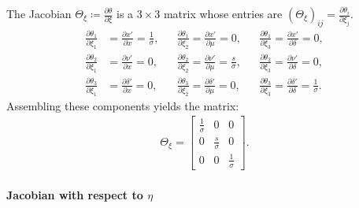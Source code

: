 \documentclass{article}
\begin{document}
The Jacobian $\Theta_\xi \coloneqq \frac{\partial \theta}{\partial \xi}$ is a $3 \times 3$ matrix whose entries are $(\Theta_\xi)_{ij} = \frac{\partial \theta_i}{\partial \xi_j}$.
%
\begin{align}
  \frac{\partial \theta_1}{\partial \xi_1} & = \frac{\partial x'}{\partial x} = \frac{1}{\sigma}, &  & \frac{\partial \theta_1}{\partial \xi_2} = \frac{\partial x'}{\partial \mu} = 0,                  &  & \frac{\partial \theta_1}{\partial \xi_3} = \frac{\partial x'}{\partial \delta} = 0,                     \\
  \frac{\partial \theta_2}{\partial \xi_1} & = \frac{\partial \nu'}{\partial x} = 0,              &  & \frac{\partial \theta_2}{\partial \xi_2} = \frac{\partial \nu'}{\partial \mu} = \frac{s}{\sigma}, &  & \frac{\partial \theta_2}{\partial \xi_3} = \frac{\partial \nu'}{\partial \delta} = 0,                   \\
  \frac{\partial \theta_3}{\partial \xi_1} & = \frac{\partial \delta'}{\partial x} = 0,           &  & \frac{\partial \theta_3}{\partial \xi_2} = \frac{\partial \delta'}{\partial \mu} = 0,             &  & \frac{\partial \theta_3}{\partial \xi_3} = \frac{\partial \delta'}{\partial \delta} = \frac{1}{\sigma}.
\end{align}
%
Assembling these components yields the matrix:
%
\begin{align}
  \Theta_{\xi} =
  \begin{bmatrix}
    \frac{1}{\sigma} & 0                & 0                \\
    0                & \frac{s}{\sigma} & 0                \\
    0                & 0                & \frac{1}{\sigma}
  \end{bmatrix}.
\end{align}

\paragraph{Jacobian with respect to $\eta$}
\end{document}
